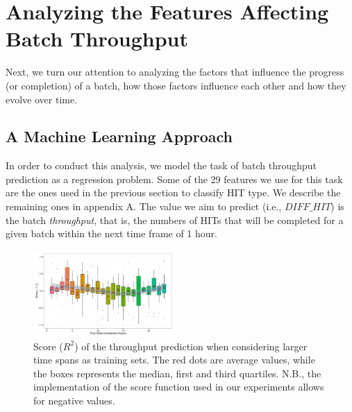 \section{Analyzing the Features Affecting Batch Throughput}
\label{sec:throughput}
Next, we turn our attention to analyzing the factors that influence the  progress (or completion) of a batch, how those factors influence each other and how they evolve over time.

\subsection{A Machine Learning Approach}
In order to conduct this analysis, we model the task of batch throughput prediction as a regression problem.  Some of the  29  features we use for this task are the ones used in the previous section to classify HIT type.  We describe the remaining ones in appendix A. The value  we aim to predict (i.e.,   $DIFF\_HIT$) is the batch \emph{throughput}, that is, the numbers of HITs that   will be completed for a given batch within the next time frame of 1 hour.

\begin{figure}[tb]
	\centering
		\includegraphics[width=0.48\textwidth]{figures/ML_accuracy}
	\caption{Score ($R^2$) of the throughput prediction when considering larger time spans as training sets. The red dots are average values, while the boxes represents the median, first and third quartiles. N.B., the implementation of the score function used in our experiments allows for negative values.}
	\label{fig:accuracy}
\end{figure}

